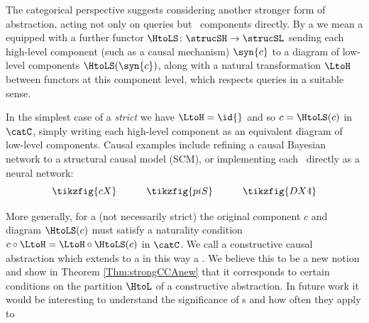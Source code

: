 \documentclass{article}
\begin{document}
The categorical perspective suggests considering another stronger form of abstraction, acting not only on queries but \ components directly.  By a \emph{\strucdown{}} we mean a \qdownfull{} equipped with a further functor $\HtoLS \colon \strucSH \to \strucSL$ sending each high-level component (such as a causal mechanism) $\syn{c}$ to a diagram of low-level components $\HtoLS(\syn{c})$, along with a natural transformation $\LtoH$ between functors at this component level, which respects queries in a suitable sense. 

In the simplest case of a \emph{strict} \strucdown{} we have $\LtoH=\id{}$ and so $c = \HtoLS(c)$ in $\catC$, simply writing each high-level component as an equivalent diagram of low-level components. Causal examples include refining a causal Bayesian network to a structural causal model (SCM), or implementing each \ directly as a neural network:  
\[
\tikzfig{cX}
\qquad \quad 
\tikzfig{piS}
\qquad \quad 
\tikzfig{DX4}
\]

More generally, for a (not necessarily strict) \strucdown{} the original component $c$ and diagram $\HtoLS(c)$
must satisfy a naturality condition $c \circ \LtoH = \LtoH \circ \HtoLS(c)$ in $\catC$. We call a constructive causal abstraction which extends to a \strucdown{} in this way a \emph{\strongCCA{}}. We believe this to be a new notion and show in Theorem \ref{Thm:strongCCAnew} that it corresponds to certain conditions on the partition $\HtoL$ of a constructive abstraction. In future work it would be interesting to understand the significance of \strongCCA{}s and how often they apply to  

\end{document}

